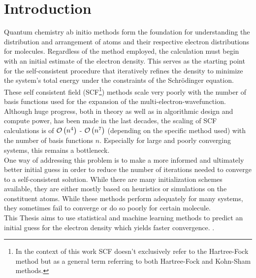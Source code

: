 \chapter{Introduction}
\label{sec:introduction}

Quantum chemistry ab initio methods form the foundation for understanding the distribution and arrangement of atoms and their respective electron distributions for molecules. Regardless of the method employed, the calculation must begin with an initial estimate of the electron density. This serves as the starting point for the self-consistent procedure that iteratively refines the density to minimize the system's total energy under the constraints of the Schrödinger equation. These self consistent field (SCF\footnote{In the context of this work SCF doesn't exclusively refer to the Hartree-Fock method but as a general term referring to both Hartree-Fock and Kohn-Sham methods.}) methods scale very poorly with the number of basis functions used for the expansion of the multi-electron-wavefunction. Although huge progress, both in theory as well as in algorithmic design and compute power, has been made in the last decades, the scaling of SCF calculations is of $\mathcal{O}\left(n^4\right)$ - $\mathcal{O}\left(n^7\right)$ (depending on the specific method used) with the number of basis functions $n$. Especially for large and poorly converging systems, this remains a bottleneck. \\

One way of addressing this problem is to make a more informed and ultimately better initial guess in order to reduce the number of iterations needed to converge to a self-consistent solution. While there are many initialization schemes available, they are either mostly based on heuristics or simulations on the constituent atoms. While these methods perform adequately for many systems, they sometimes fail to converge or do so poorly for certain molecule. \\
This Thesis aims to use statistical and machine learning methods to predict an initial guess for the electron density which yields faster convergence. . 


